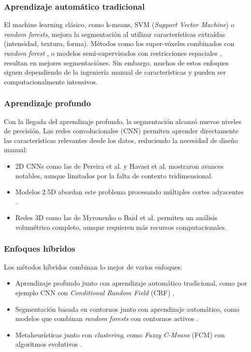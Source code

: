 \documentclass[../main.tex]{subfiles}
\begin{document}
\subsubsection{Aprendizaje automático tradicional}
El machine learning clásico, como k-means, SVM (\textit{Support Vector Machine}) o \textit{random forests}, mejora la segmentación al utilizar características extraídas (intensidad, textura, forma). Métodos como los super-vóxeles combinados con \textit{random forest} \cite{SOLTANINEJAD201869}, o modelos semi-supervisados con restricciones espaciales \cite{8481468}, resultan en mejores segmentaciónes. Sin
embargo, muchos de estos enfoques siguen dependiendo de la ingeniería manual de características y pueden ser computacionalmente intensivos.

\subsubsection{Aprendizaje profundo}
Con la llegada del aprendizaje profundo, la segmentación alcanzó nuevos niveles de precisión. Las redes convolucionales (CNN) permiten aprender directamente las características relevantes desde los datos, reduciendo la necesidad de diseño manual:

\begin{itemize}
    \item 2D CNNs como las de Pereira et al. \cite{7426413} y Havaei et al. \cite{HAVAEI201718} mostraron avances notables, aunque limitados por la falta de contexto tridimensional.
    \item Modelos 2.5D abordan este problema procesando múltiples cortes adyacentes \cite{MILLETARI201792,wang2019automatic}.
    \item Redes 3D como las de Myronenko \cite{myronenko2018mri} o Baid et al. \cite{baid2020novel} permiten un análisis volumétrico completo, aunque requieren más recursos computacionales.

\end{itemize}
    
\subsubsection{Enfoques híbridos}
Los métodos híbridos combinan lo mejor de varios enfoques:
\begin{itemize}
    \item Aprendizaje profundo junto con aprendizaje automático tradicional, como por ejemplo CNN con \textit{Conditional Random Field } (CRF) \cite{kamnitsas2017efficient}.
    \item Segmentación basada en contornos junto con aprendizaje automático, como modelos que combinan \textit{random forests} con contornos activos \cite{ma2018concatenated}.
    \item Metaheurísticas junto con \textit{clustering}, como \textit{Fuzzy C-Means} (FCM) con algoritmos evolutivos \cite{pham2019multi}.
 
\end{itemize}
\end{document}
